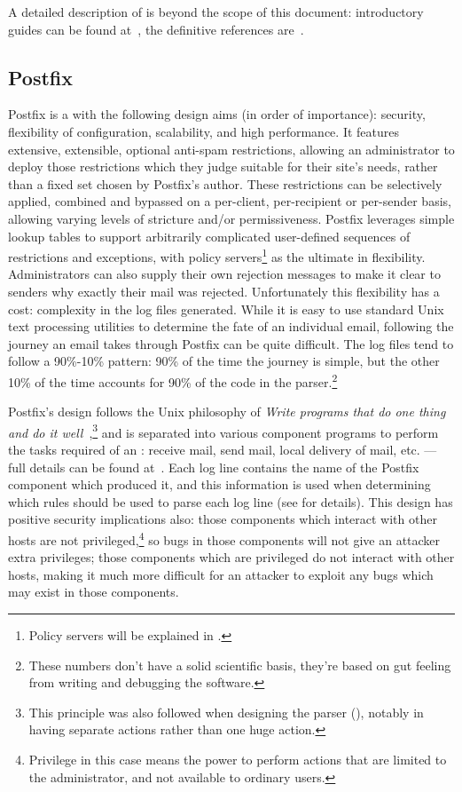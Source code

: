 A detailed description of \SMTP{} is beyond the scope of this document:
introductory guides can be found at~\cite{smtp-intro-01, smtp-intro-02},
the definitive references are~\cite{RFC821, RFC2821}.

\subsection{Postfix}

\label{postfix background}

Postfix is a \MTA{} with the following design aims (in order of
importance): security, flexibility of configuration, scalability, and high
performance.  It features extensive, extensible, optional anti-spam
restrictions, allowing an administrator to deploy those restrictions which
they judge suitable for their site's needs, rather than a fixed set chosen
by Postfix's author.  These restrictions can be selectively applied,
combined and bypassed on a per-client, per-recipient or per-sender basis,
allowing varying levels of stricture and/or permissiveness.  Postfix
leverages simple lookup tables to support arbitrarily complicated
user-defined sequences of restrictions and exceptions, with policy
servers\footnote{Policy servers will be explained in .} as the ultimate in flexibility.  Administrators can also supply
their own rejection messages to make it clear to senders why exactly their
mail was rejected.  Unfortunately this flexibility has a cost: complexity
in the log files generated.  While it is easy to use standard Unix text
processing utilities to determine the fate of an individual email,
following the journey an email takes through Postfix can be quite
difficult.  The log files tend to follow a 90\%-10\% pattern: 90\% of the
time the journey is simple, but the other 10\% of the time accounts for
90\% of the code in the parser.\footnote{These numbers don't have a solid
scientific basis, they're based on gut feeling from writing and debugging
the software.}

Postfix's design follows the Unix philosophy of \textit{Write programs that
do one thing and do it well\/}~\cite{unix-philosophy},\footnote{This
principle was also followed when designing the parser (), notably in having separate actions rather than one huge action.}
and is separated into various component programs to perform the tasks
required of an \MTA{}\@: receive mail, send mail, local delivery of mail,
etc. --- full details can be found at~\cite{postfix-overview}.  Each log
line contains the name of the Postfix component which produced it, and this
information is used when determining which rules should be used to parse
each log line (see  for details).  This
design has positive security implications also: those components which
interact with other hosts are not privileged,\footnote{Privilege in this
case means the power to perform actions that are limited to the
administrator, and not available to ordinary users.} so bugs in those
components will not give an attacker extra privileges; those components
which are privileged do not interact with other hosts, making it much more
difficult for an attacker to exploit any bugs which may exist in those
components.

